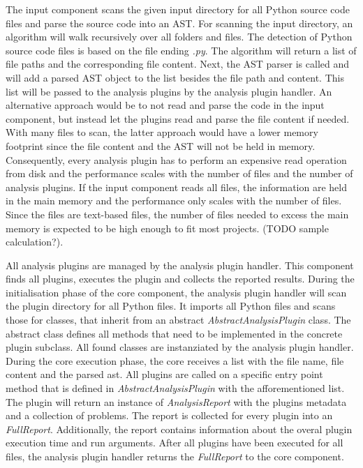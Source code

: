 The input component scans the given input directory for all Python source code files and parse the source code into an AST. 
For scanning the input directory, an algorithm will walk recursively over all folders and files. The detection of Python source code files is based on the file ending \textit{.py}. The algorithm will return a list of file paths and the corresponding file content. 
Next, the AST parser is called and will add a parsed AST object to the list besides the file path and content. This list will be passed to the analysis plugins by the analysis plugin handler.  An alternative approach would be to not read and parse the code in the input component, but instead let the plugins read and parse the file content if needed. With many files to scan, the latter approach would have a lower memory footprint since the file content and the AST will not be held in memory. Consequently, every analysis plugin has to perform an expensive read operation from disk and the performance scales with the number of files and the number of analysis plugins. 
If the input component reads all files, the information are held in the main memory and the performance only scales with the number of files. Since the files are text-based files, the number of files needed to excess the main memory is expected to be high enough to fit most projects. (TODO sample calculation?).

All analysis plugins are managed by the analysis plugin handler. This component finds all plugins, executes the plugin and collects the reported results.
During the initialisation phase of the core component, the analysis plugin handler will scan the plugin directory for all Python files. It imports all Python files and scans those for classes, that inherit from an abstract \textit{AbstractAnalysisPlugin} class. The abstract class defines all methods that need to be implemented in the concrete plugin subclass. All found classes are instanziated by the analysis plugin handler.
During the core execution phase, the core receives a list with the file name, file content and the parsed ast. All plugins are called on a specific entry point method that is defined in \textit{AbstractAnalysisPlugin} with the afforementioned list. The plugin will return an instance of \textit{AnalysisReport} with the plugins metadata and a collection of problems. The report is collected for every plugin into an \textit{FullReport}. Additionally, the report contains information about the overal plugin execution time and run arguments. After all plugins have been executed for all files, the analysis plugin handler returns the \textit{FullReport} to the core component.

